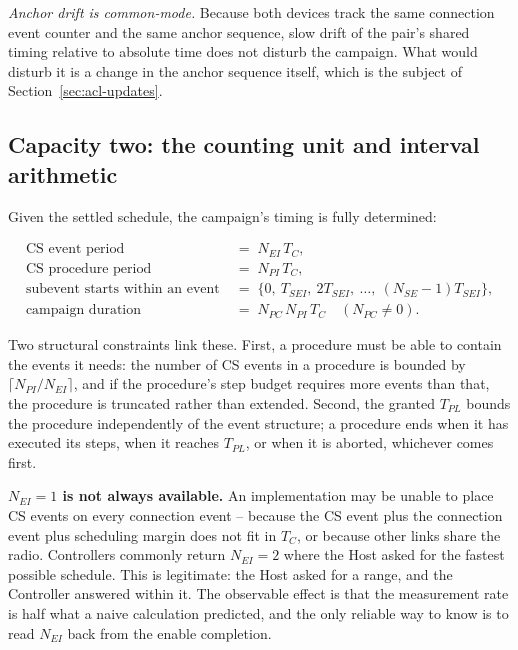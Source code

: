 \documentclass[11pt,a4paper]{article}
\newcommand{\Tconn}{T_{C}}
\newcommand{\Tsei}{T_{SEI}}
\newcommand{\Nse}{N_{SE}}
\newcommand{\Nei}{N_{EI}}
\newcommand{\Npi}{N_{PI}}
\newcommand{\Npc}{N_{PC}}
\newcommand{\Tpl}{T_{PL}}
\begin{document}
\emph{Anchor drift is common-mode.} Because both devices track the same connection event counter and
the same anchor sequence, slow drift of the pair's shared timing relative to absolute time does not
disturb the campaign. What would disturb it is a change in the anchor sequence itself, which is the
subject of Section~\ref{sec:acl-updates}.

\subsection{Capacity two: the counting unit and interval arithmetic}

Given the settled schedule, the campaign's timing is fully determined:

\begin{align}
\text{CS event period} \;&=\; \Nei \,\Tconn, \label{eq:eventperiod}\\
\text{CS procedure period} \;&=\; \Npi \,\Tconn, \label{eq:procperiod}\\
\text{subevent starts within an event} \;&=\; \{0,\ \Tsei,\ 2\Tsei,\ \dots,\ (\Nse-1)\Tsei\},
   \label{eq:sestarts}\\
\text{campaign duration} \;&=\; \Npc \,\Npi \,\Tconn \quad (\Npc \ne 0).
   \label{eq:campaignlen}
\end{align}

Two structural constraints link these. First, a procedure must be able to contain the events it
needs: the number of CS events in a procedure is bounded by $\lceil \Npi / \Nei \rceil$, and if the
procedure's step budget requires more events than that, the procedure is truncated rather than
extended. Second, the granted $\Tpl$ bounds the procedure independently of the event structure; a
procedure ends when it has executed its steps, when it reaches $\Tpl$, or when it is aborted,
whichever comes first.

\begin{callout}
\textbf{$\Nei = 1$ is not always available.} An implementation may be unable to place CS events on
every connection event -- because the CS event plus the connection event plus scheduling margin does
not fit in $\Tconn$, or because other links share the radio. Controllers commonly return $\Nei = 2$
where the Host asked for the fastest possible schedule. This is legitimate: the Host asked for a
range, and the Controller answered within it. The observable effect is that the measurement rate is
half what a naive calculation predicted, and the only reliable way to know is to read
$\Nei$ back from the enable completion.
\end{callout}
\end{document}
